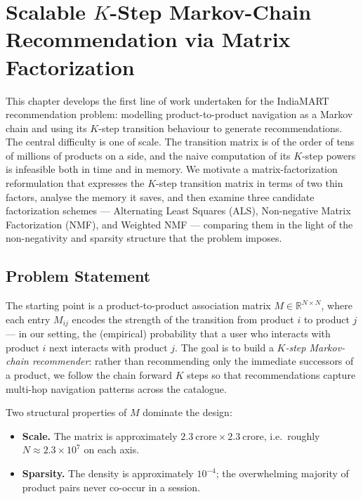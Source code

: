 \chapter{Scalable \texorpdfstring{$K$}{K}-Step Markov-Chain Recommendation via Matrix Factorization}
\label{ch:markov-factorization}

This chapter develops the first line of work undertaken for the IndiaMART
recommendation problem: modelling product-to-product navigation as a Markov
chain and using its $K$-step transition behaviour to generate
recommendations. The central difficulty is one of scale. The transition
matrix is of the order of tens of millions of products on a side, and the
naive computation of its $K$-step powers is infeasible both in time and in
memory. We motivate a matrix-factorization reformulation that expresses the
$K$-step transition matrix in terms of two thin factors, analyse the memory
it saves, and then examine three candidate factorization schemes ---
Alternating Least Squares (ALS), Non-negative Matrix Factorization (NMF), and
Weighted NMF --- comparing them in the light of the non-negativity and
sparsity structure that the problem imposes.

\section{Problem Statement}
\label{sec:mf-problem}

The starting point is a product-to-product association matrix
$M \in \mathbb{R}^{N \times N}$, where each entry $M_{ij}$ encodes the
strength of the transition from product $i$ to product $j$ --- in our setting,
the (empirical) probability that a user who interacts with product $i$ next
interacts with product $j$. The goal is to build a \emph{$K$-step Markov-chain
recommender}: rather than recommending only the immediate successors of a
product, we follow the chain forward $K$ steps so that recommendations capture
multi-hop navigation patterns across the catalogue.

Two structural properties of $M$ dominate the design:

\begin{itemize}
  \item \textbf{Scale.} The matrix is approximately
        $2.3~\text{crore} \times 2.3~\text{crore}$, i.e.\ roughly
        $N \approx 2.3 \times 10^{7}$ on each axis.
  \item \textbf{Sparsity.} The density is approximately $10^{-4}$; the
        overwhelming majority of product pairs never co-occur in a session.
\end{itemize}

